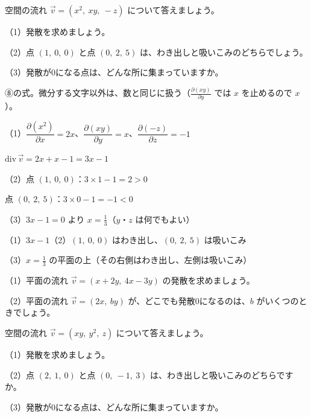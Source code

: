 \begin{reidai}[場所によって変わる発散（空間）]
空間の流れ $\vec v=(x^2,\ xy,\ -z)$ について答えましょう。\par
（1）発散を求めましょう。\par
（2）点 $(1,\ 0,\ 0)$ と点 $(0,\ 2,\ 5)$ は、わき出しと吸いこみのどちらでしょう。\par
（3）発散が0になる点は、どんな所に集まっていますか。\par
\kangaekata ⑧の式。微分する文字以外は、数と同じに扱う（$\frac{\partial(xy)}{\partial y}$ では $x$ を止めるので $x$）。\par
\shiki\kviiijs{}\zw{} （1）$\dfrac{\partial(x^2)}{\partial x}=2x$、$\dfrac{\partial(xy)}{\partial y}=x$、$\dfrac{\partial(-z)}{\partial z}=-1$\par
\kviiijb $\mathrm{div}\,\vec v=2x+x-1=3x-1$\par
\kviiija （2）点 $(1,\ 0,\ 0)$：$3\times1-1=2>0$\par
\kviiijb 点 $(0,\ 2,\ 5)$：$3\times0-1=-1<0$\par
\kviiija （3）$3x-1=0$ より $x=\frac13$（$y$・$z$ は何でもよい）\par
\kotae\kviiijs{}\zw{} （1）$3x-1$\quad （2）$(1,\ 0,\ 0)$ はわき出し、$(0,\ 2,\ 5)$ は吸いこみ\par
\kviiija （3）$x=\frac13$ の平面の上（その右側はわき出し、左側は吸いこみ）
\end{reidai}

\begingroup{}%
\noindent\begin{minipage}[t]{0.485\linewidth}\vspace{0pt}
\begin{jibun}
\raggedright （1）平面の流れ $\vec v=(x+2y,\ 4x-3y)$ の発散を求めましょう。\par
（2）平面の流れ $\vec v=(2x,\ by)$ が、どこでも発散0になるのは、$b$ がいくつのときでしょう。
\end{jibun}
\end{minipage}\hfill
\begin{minipage}[t]{0.485\linewidth}\vspace{0pt}
\begin{jibun}
\raggedright 空間の流れ $\vec v=(xy,\ y^2,\ z)$ について答えましょう。\par
（1）発散を求めましょう。\par
（2）点 $(2,\ 1,\ 0)$ と点 $(0,\ -1,\ 3)$ は、わき出しと吸いこみのどちらですか。\par
（3）発散が0になる点は、どんな所に集まっていますか。
\end{jibun}
\end{minipage}\par
\endgroup

